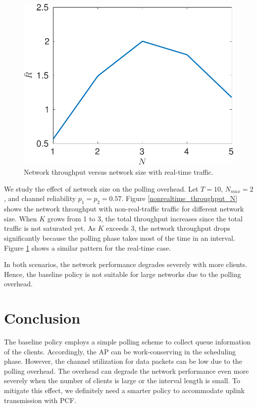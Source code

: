 \documentclass{article}
\begin{document}
\begin{figure}[htbp]
\centering
\includegraphics[scale=0.7]{realtime_throughput_N.pdf}
\caption{Network throughput versus network size with real-time traffic.}
\label{realtime_throughput_N}
\end{figure}
We study the effect of network size on the polling overhead. Let $T = 10$, $N_{max}=2$, and channel reliability $p_1 = p_2 = 0.57$. Figure \ref{nonrealtime_throughput_N} shows the network throughput with non-real-traffic traffic for different network size. When $K$ grows from 1 to 3, the total throughput increases since the total traffic is not saturated yet. As $K$ exceeds 3, the network throughput drops significantly because the polling phase takes most of the time in an interval. Figure \ref{realtime_throughput_N} shows a similar pattern for the real-time case. 

In both scenarios, the network performance degrades severely with more clients. Hence, the baseline policy is not suitable for large networks due to the polling overhead. 



\section{Conclusion}
The baseline policy employs a simple polling scheme to collect queue information of the clients. Accordingly, the AP can be work-conserving in the scheduling phase. However, the channel utilization for data packets can be low due to the polling overhead. The overhead can degrade the network performance even more severely when the number of clients is large or the interval length is small. To mitigate this effect, we definitely need a smarter policy to accommodate uplink transmission with PCF.
\end{document}
